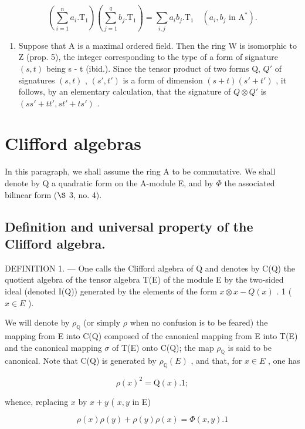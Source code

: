 \[
(\sum_ {i = 1} ^ {n} a _ {i}. \mathrm{T} _ {1}) (\sum_ {j = 1} ^ {q} b _ {j}. \mathrm{T} _ {1}) = \sum_ {i, j} a _ {i} b _ {j}. \mathrm{T} _ {1} \quad (a _ {i}, b _ {j} \text {   in   } \mathrm{A} ^ {*}).\tag{8}
\]

\begin{enumerate}
\def\labelenumi{\arabic{enumi})}
\setcounter{enumi}{2}
\tightlist
\item
  Suppose that A is a maximal ordered field. Then the ring W is isomorphic to Z (prop. 5), the integer corresponding to the type of a form of signature \((s, t)\) being s - t (ibid.). Since the tensor product of two forms Q, \(Q'\) of signatures \((s, t)\) , \((s', t')\) is a form of dimension \((s + t)(s' + t')\) , it follows, by an elementary calculation, that the signature of \(Q \otimes Q'\) is \((ss' + tt', st' + ts')\) .
\end{enumerate}

\section{Clifford algebras}

In this paragraph, we shall assume the ring A to be commutative. We shall denote by Q a quadratic form on the A-module E, and by \(\Phi\) the associated bilinear form (\(\S\) 3, no. 4).

\subsection{Definition and universal property of the Clifford algebra.}

DEFINITION 1. --- One calls the Clifford algebra of Q and denotes by C(Q) the quotient algebra of the tensor algebra T(E) of the module E by the two-sided ideal (denoted I(Q)) generated by the elements of the form \(x \otimes x - Q(x)\) . 1 ( \(x \in E\) ).

We will denote by \(\rho_{\mathbb{Q}}\) (or simply \(\rho\) when no confusion is to be feared) the mapping from E into C(Q) composed of the canonical mapping from E into T(E) and the canonical mapping \(\sigma\) of T(E) onto C(Q); the map \(\rho_{\mathbb{Q}}\) is said to be canonical. Note that C(Q) is generated by \(\rho_{\mathbb{Q}}(E)\) , and that, for \(x \in E\) , one has

\[
\rho (x) ^ {2} = \mathrm{Q} (x). 1;\tag{1}
\]

whence, replacing \(x\) by \(x + y\) ( \(x, y\) in E)

\[
\rho (x) \rho (y) + \rho (y) \rho (x) = \Phi (x, y). 1\tag{2}
\]

